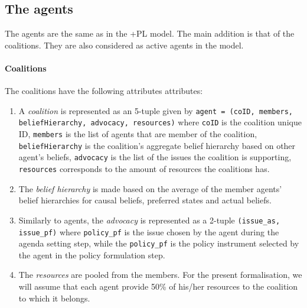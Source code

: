 \documentclass[11pt]{article}
\begin{document}

\subsection{The agents}

The agents are the same as in the +PL model. The main addition is that of the coalitions. They are also considered as active agents in the model.

\paragraph{Coalitions}

The coalitions have the following attributes attributes:

\begin{enumerate}

\item A \emph{coalition} is represented as an 5-tuple given by \texttt{agent = (coID, members, beliefHierarchy, advocacy, resources)} where
\texttt{coID} is the coalition unique ID,
\texttt{members} is the list of agents that are member of the coalition, 
\texttt{beliefHierarchy} is the coalition's aggregate belief hierarchy based on other agent's beliefs, 
\texttt{advocacy} is the list of the issues the coalition is supporting,
\texttt{resources} corresponds to the amount of resources the coalitions has.

\item The \emph{belief hierarchy} is made based on the average of the member agents' belief hierarchies for causal beliefs, preferred states and actual beliefs.

\item Similarly to agents, the \emph{advocacy} is represented as a 2-tuple \texttt{(issue\_as, issue\_pf)} where \texttt{policy\_pf} is the issue chosen by the agent during the agenda setting step, while the \texttt{policy\_pf} is the policy instrument selected by the agent in the policy formulation step.

\item The \emph{resources} are pooled from the members. For the present formalisation, we will assume that each agent provide 50\% of his/her resources to the coalition to which it belongs. 

\end{enumerate}

\end{document}
